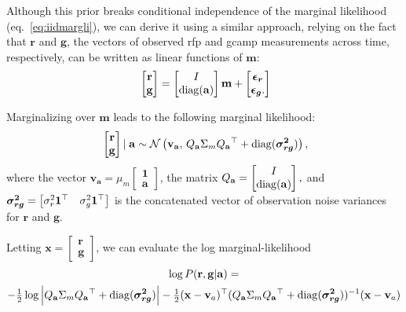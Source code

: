 \documentclass[11pt]{article}
\renewcommand{\eqref}[1]{eq.~\ref{eq:#1}}
\newcommand{\vr}{\sigma^2_r}
\newcommand{\vg}{\sigma^2_g}
\newcommand{\vecv}{\mathbf{v}}
\newcommand{\vecm}{\mathbf{m}}
\newcommand{\vx}{\mathbf{x}}
\newcommand{\vecr}{\mathbf{r}}
\newcommand{\vecg}{\mathbf{g}}
\newcommand{\vones}{\mathbf{1}}
\newcommand{\veca}{\mathbf{a}}
\begin{document}
Although this prior breaks conditional independence of the marginal
likelihood (\eqref{iidmargli}), we can derive it using a similar
approach, relying on the fact that $\vecr$ and $\vecg$, the vectors of
observed rfp and gcamp measurements across time, respectively, can be written as
linear functions of $\vecm$:
\begin{equation}
\
\begin{bmatrix}
  \vecr \\ \vecg 
\end{bmatrix} = 
\begin{bmatrix}
  I \\ \diag(\veca)
\end{bmatrix} \vecm  + 
\begin{bmatrix}
  \bm{\epsilon_r} \\ \bm{\epsilon_g}.
\end{bmatrix} 
\end{equation}

Marginalizing over $\vecm$ leads to the following marginal likelihood:
\begin{equation} \label{eq:iidmargli}
\
\begin{bmatrix}
  \vecr \\ \vecg 
\end{bmatrix} | \; \veca \sim \Nrm \left( 
 \vecv_{\veca} ,\,  Q_{\veca} \Sigma_m Q_{\veca} \trp +  
\diag ( \bm{\sigma^2_{rg}} )
\right),  
\end{equation}
where the vector 
$\vecv_\veca = \mu_m \begin{bmatrix}
  \vones  \\  \veca
\end{bmatrix} $, 
the matrix
$Q_{\veca} = \begin{bmatrix}
  I \\ \diag(\veca)
\end{bmatrix},
$
and 
$\bm{\sigma^2_{rg}}  = 
\begin{bmatrix} \vr \vones\trp &  \vg \vones\trp 
\end{bmatrix}$ is the concatenated vector of observation noise
variances for $\vecr$ and $\vecg$.

Letting $\vx = \begin{bmatrix}  \vecr  \\ \vecg 
\end{bmatrix}$, 
we can evaluate the log marginal-likelihood
\begin{multline} \label{eq:logmargliSmooth}
\log P(\vecr,\vecg | \veca) = \\ -\tonehlf \log \Big|Q_{\veca} \Sigma_m Q_{\veca} \trp +  
\diag ( \bm{\sigma^2_{rg}} ) \Big| - \tonehlf (\vx - \vecv_a)\trp
(Q_{\veca} \Sigma_m Q_{\veca} \trp +  
\diag ( \bm{\sigma^2_{rg}} )) \inv (\vx-\vecv_a)
\end{multline}
\end{document}
